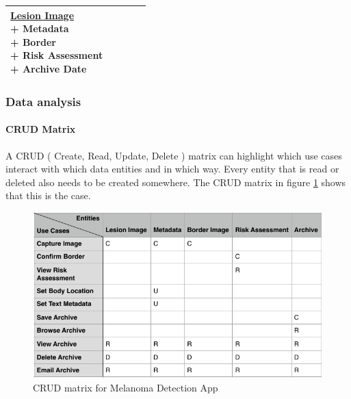 \begin{longtable}[H]{ | l | p{3.0cm} | p{2.5cm} | p{1.0cm} | p{2.5cm} | }
                        \specialcell[t]{\hyperlink{lesion_image}{Lesion Image}
                            \\ + Metadata
                            \\ + Border
                            \\ + Risk Assessment
                            \\ + Archive Date
                        }

                     & & \\ \hline

                \end{longtable}


        \subsubsection{Data analysis}
            \paragraph{CRUD Matrix}

                A CRUD ( Create, Read, Update, Delete ) matrix can highlight which use cases interact with which data entities and in which way. Every entity that is read or deleted also needs to be created somewhere. The CRUD matrix in figure \ref{fig:crud} shows that this is the case.

                \begin{figure}[H]
                    \centering
                    \includegraphics[width=\textwidth]{assets/requirements/CRUD.pdf}
                    \caption{CRUD matrix for Melanoma Detection App}
                    \label{fig:crud}
                \end{figure}

